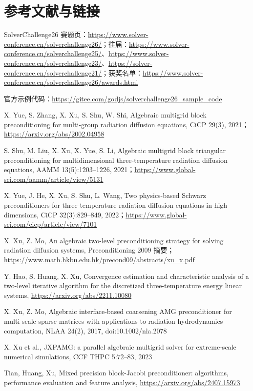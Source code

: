 \documentclass[11pt,a4paper]{ctexart}
\begin{document}
\section*{参考文献与链接}
\sloppy
\begin{enumerate}[label={[\arabic*]},itemsep=1pt]\small
\item SolverChallenge26 赛题页：\url{https://www.solver-conference.cn/solverchallenge26/}；往届：\url{https://www.solver-conference.cn/solverchallenge25/}、\url{https://www.solver-conference.cn/solverchallenge23/}、\url{https://solver-conference.cn/solverchallenge21/}；获奖名单：\url{https://www.solver-conference.cn/solverchallenge26/awards.html}
\item 官方示例代码：\url{https://gitee.com/godjs/solverchallenge26_sample_code}
\item X. Yue, S. Zhang, X. Xu, S. Shu, W. Shi, Algebraic multigrid block preconditioning for multi-group radiation diffusion equations, CiCP 29(3), 2021；\url{https://arxiv.org/abs/2002.04958}
\item S. Shu, M. Liu, X. Xu, X. Yue, S. Li, Algebraic multigrid block triangular preconditioning for multidimensional three-temperature radiation diffusion equations, AAMM 13(5):1203--1226, 2021；\url{https://www.global-sci.com/aamm/article/view/5131}
\item X. Yue, J. He, X. Xu, S. Shu, L. Wang, Two physics-based Schwarz preconditioners for three-temperature radiation diffusion equations in high dimensions, CiCP 32(3):829--849, 2022；\url{https://www.global-sci.com/cicp/article/view/7101}
\item X. Xu, Z. Mo, An algebraic two-level preconditioning strategy for solving radiation diffusion systems, Preconditioning 2009 摘要；\url{https://www.math.hkbu.edu.hk/precond09/abstracts/xu_x.pdf}
\item Y. Hao, S. Huang, X. Xu, Convergence estimation and characteristic analysis of a two-level iterative algorithm for the discretized three-temperature energy linear systems, \url{https://arxiv.org/abs/2211.10080}
\item X. Xu, Z. Mo, Algebraic interface-based coarsening AMG preconditioner for multi-scale sparse matrices with applications to radiation hydrodynamics computation, NLAA 24(2), 2017, doi:10.1002/nla.2078
\item X. Xu et al., JXPAMG: a parallel algebraic multigrid solver for extreme-scale numerical simulations, CCF THPC 5:72--83, 2023
\item Tian, Huang, Xu, Mixed precision block-Jacobi preconditioner: algorithms, performance evaluation and feature analysis, \url{https://arxiv.org/abs/2407.15973}

\end{enumerate}
\end{document}
